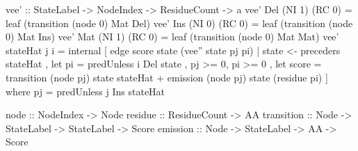 vee' :: StateLabel -> NodeIndex -> ResidueCount -> a
vee' Del (NI 1) (RC 0) = leaf (transition (node 0) Mat Del)
vee' Ins (NI 0) (RC 0) = leaf (transition (node 0) Mat Ins)
vee' Mat (NI 1) (RC 0) = leaf (transition (node 0) Mat Mat)
vee' stateHat j i = 
  internal [ edge score state (vee'' state pj pi)
           | state <- preceders stateHat
           , let pi = predUnless i Del state
           , pj >= 0, pi >= 0
           , let score = transition (node pj) state stateHat
                         + emission (node pj) state (residue pi)
           ]
  where pj = predUnless j Ins stateHat

node       :: NodeIndex -> Node
residue    :: ResidueCount -> AA
transition :: Node -> StateLabel -> StateLabel -> Score
emission   :: Node -> StateLabel -> AA -> Score
